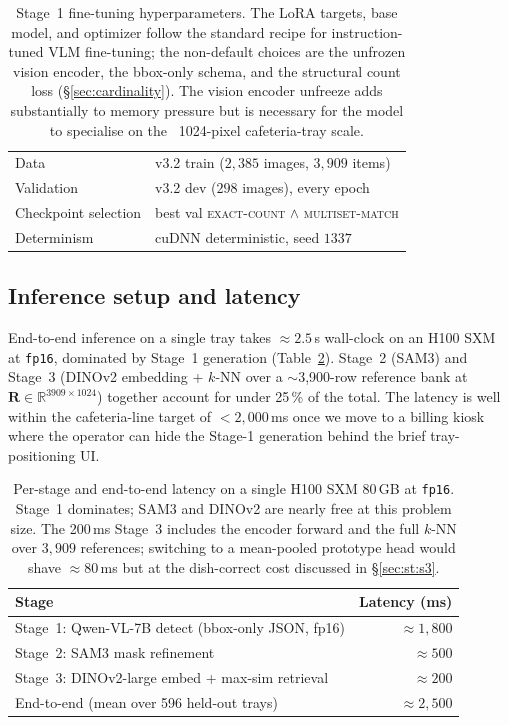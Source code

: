 \begin{table}[t]
\begin{tabular}{ll}
Data                     & v3.2 train ($2{,}385$ images, $3{,}909$ items) \\
Validation               & v3.2 dev ($298$ images), every epoch \\
Checkpoint selection     & best val \textsc{exact-count} $\wedge$ \textsc{multiset-match} \\
Determinism              & cuDNN deterministic, seed $1337$ \\
\bottomrule
\end{tabular}
\caption{Stage~1 fine-tuning hyperparameters. The LoRA targets, base model,
and optimizer follow the standard recipe for instruction-tuned VLM
fine-tuning; the non-default choices are the unfrozen vision encoder,
the bbox-only schema, and the structural count loss
(\S\ref{sec:cardinality}). The vision encoder unfreeze adds substantially
to memory pressure but is necessary for the model to specialise on the
~1024-pixel cafeteria-tray scale.}
\label{tab:train-hp}
\end{table}

\subsection{Inference setup and latency}
\label{sec:st:inf}

End-to-end inference on a single tray takes $\approx 2.5$\,s wall-clock on
an H100 SXM at \texttt{fp16}, dominated by Stage~1 generation
(Table~\ref{tab:latency}). Stage~2 (SAM3) and Stage~3 (DINOv2 embedding +
$k$-NN over a $\sim$3{,}900-row reference bank at $\mathbf{R} \in
\mathbb{R}^{3909 \times 1024}$) together account for under 25\,\% of the
total. The latency is well within the cafeteria-line target of
$<2{,}000$\,ms once we move to a billing kiosk where the operator can hide
the Stage-1 generation behind the brief tray-positioning UI.

\begin{table}[t]
\centering\small
\begin{tabular}{lr}
\toprule
\textbf{Stage}                                            & \textbf{Latency (ms)} \\
\midrule
Stage~1: Qwen-VL-7B detect (bbox-only JSON, fp16)         & $\approx 1{,}800$ \\
Stage~2: SAM3 mask refinement                             & $\approx 500$ \\
Stage~3: DINOv2-large embed + max-sim retrieval           & $\approx 200$ \\
\midrule
End-to-end (mean over 596 held-out trays)                 & $\approx 2{,}500$ \\
\bottomrule
\end{tabular}
\caption{Per-stage and end-to-end latency on a single H100 SXM 80\,GB at
\texttt{fp16}. Stage~1 dominates; SAM3 and DINOv2 are nearly free at this
problem size. The 200\,ms Stage~3 includes the encoder forward and the
full $k$-NN over $3{,}909$ references; switching to a mean-pooled prototype
head would shave $\approx 80\,$ms but at the dish-correct cost discussed
in \S\ref{sec:st:s3}.}
\label{tab:latency}
\end{table}

